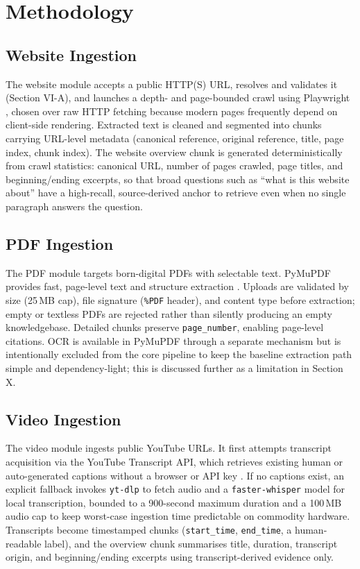 \documentclass[conference]{IEEEtran}
\begin{document}
\section{Methodology}

\subsection{Website Ingestion}
The website module accepts a public HTTP(S) URL, resolves and validates
it (Section VI-A), and launches a depth- and page-bounded crawl using
Playwright \cite{playwright2026}, chosen over raw HTTP fetching because
modern pages frequently depend on client-side rendering. Extracted text
is cleaned and segmented into chunks carrying URL-level metadata
(canonical reference, original reference, title, page index, chunk
index). The website overview chunk is generated deterministically from
crawl statistics: canonical URL, number of pages crawled, page titles,
and beginning/ending excerpts, so that broad questions such as ``what is
this website about'' have a high-recall, source-derived anchor to
retrieve even when no single paragraph answers the question.

\subsection{PDF Ingestion}
The PDF module targets born-digital PDFs with selectable text.
PyMuPDF provides fast, page-level text and structure extraction
\cite{pymupdf2026,pymupdf_text2026}. Uploads are validated by size (25\,MB
cap), file signature (\texttt{\%PDF} header), and content type before
extraction; empty or textless PDFs are rejected rather than silently
producing an empty knowledgebase. Detailed chunks preserve
\texttt{page\_number}, enabling page-level citations. OCR is available in
PyMuPDF through a separate mechanism \cite{pymupdf_ocr2026} but is
intentionally excluded from the core pipeline to keep the baseline
extraction path simple and dependency-light; this is discussed further
as a limitation in Section X.

\subsection{Video Ingestion}
The video module ingests public YouTube URLs. It first attempts
transcript acquisition via the YouTube Transcript API, which retrieves
existing human or auto-generated captions without a browser or API key
\cite{ytapi2026}. If no captions exist, an explicit fallback invokes
\texttt{yt-dlp} to fetch audio \cite{ytdlp2026} and a
\texttt{faster-whisper} model \cite{fasterwhisper2026,radford2023whisper}
for local transcription, bounded to a 900-second maximum duration and a
100\,MB audio cap to keep worst-case ingestion time predictable on
commodity hardware. Transcripts become timestamped chunks
(\texttt{start\_time}, \texttt{end\_time}, a human-readable label), and
the overview chunk summarises title, duration, transcript origin, and
beginning/ending excerpts using transcript-derived evidence only.
\end{document}
